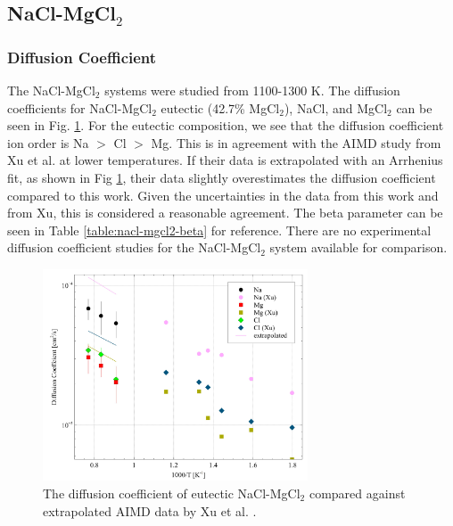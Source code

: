 \documentclass[review]{elsarticle}
\begin{document}
\FloatBarrier
\subsection{NaCl-MgCl$_2$}
\subsubsection{Diffusion Coefficient}
The NaCl-MgCl$_2$ systems were studied from 1100-1300 K. The diffusion coefficients for NaCl-MgCl$_2$ eutectic (42.7\% MgCl$_{2}$), NaCl, and MgCl$_2$ can be seen in Fig. \ref{fig:NaCl-MgCl2-diffuion}. For the eutectic composition, we see that the diffusion coefficient ion order is Na $>$ Cl $>$ Mg. This is in agreement with the AIMD study from Xu et al. \cite{xu2020powerful} at lower temperatures. If their data is extrapolated with an Arrhenius fit, as shown in Fig \ref{fig:NaCl-MgCl2-diffuion}, their data slightly overestimates the diffusion coefficient compared to this work. Given the uncertainties in the data from this work and from Xu, this is considered a reasonable agreement. The beta parameter can be seen in Table \ref{table:nacl-mgcl2-beta} for reference. There are no experimental diffusion coefficient studies for the NaCl-MgCl$_2$ system available for comparison.
\begin{figure}[!h]
 \centering
 \includegraphics[width=0.7\textwidth]{diff_eutectic_nacl_mgcl2.jpg} 
 \caption{The diffusion coefficient of eutectic NaCl-MgCl$_2$ compared against extrapolated AIMD data by Xu et al. \cite{xu2020powerful}.}
 \label{fig:NaCl-MgCl2-diffuion}
\end{figure} 
\end{document}

